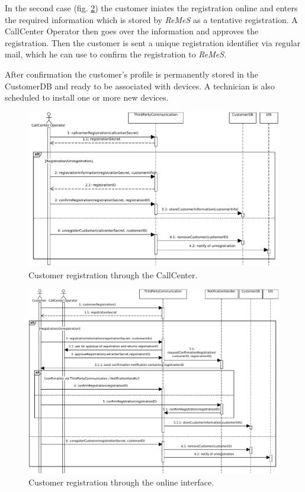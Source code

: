 \documentclass[a4paper,10pt]{article}
\newcommand{\rem}{\emph{ReMeS}\xspace}
\begin{document}
In the second case (fig. \ref{fig:seq_registration2}) the customer iniates the registration online and enters the required information which is stored by \rem as a tentative registration.
A CallCenter Operator then goes over the information and approves the registration.
Then the customer is sent a unique registration identifier via regular mail, which he can use to confirm the registration to \rem.

After confirmation the customer's profile is permanently stored in the CustomerDB and ready to be associated with devices.
A technician is also scheduled to install one or more new devices.

\begin{figure}[!htp]
    \centering
    \includegraphics[width=\textwidth]{Registration__CallCenter}
    \caption{Customer registration through the CallCenter.}
    \label{fig:seq_registration1}
\end{figure}

\begin{figure}[!htp]
    \centering
    \includegraphics[width=\textwidth]{Registration__Customer}
    \caption{Customer registration through the online interface.}
    \label{fig:seq_registration2}
\end{figure}
\end{document}

